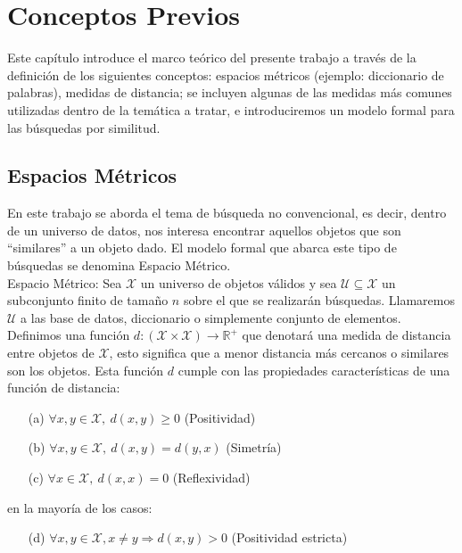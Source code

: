 \chapter{Conceptos Previos}

Este cap\'itulo introduce el marco te\'orico del presente trabajo a trav\'es de la definici\'on de los siguientes conceptos: espacios m\'etricos (ejemplo: diccionario de palabras), medidas de distancia; se incluyen algunas de las medidas m\'as comunes utilizadas dentro de la tem\'atica a tratar, e introduciremos un modelo formal para las b\'usquedas por similitud.

\section{Espacios M\'etricos}

En este trabajo se aborda el tema de b\'usqueda no convencional, es decir, dentro de un universo de datos, nos interesa encontrar aquellos objetos que son ``similares'' a un objeto dado. El modelo formal que abarca este tipo de b\'usquedas se denomina Espacio M\'etrico.\\

Espacio M\'etrico:
Sea $\mathcal{X}$ un universo de objetos v\'alidos y sea $\mathcal{U} \subseteq \mathcal{X}$ un subconjunto finito de tama\~no $n$ sobre el que se realizar\'an b\'usquedas. Llamaremos $\mathcal{U}$ a las base de datos, diccionario o simplemente conjunto de elementos. Definimos una funci\'on $d:(\mathcal{X} \times \mathcal{X}) \rightarrow \mathbb R^+$ que denotar\'a una medida de distancia entre objetos de $\mathcal{X}$, esto significa que a menor distancia m\'as cercanos o similares son los objetos. Esta funci\'on $d$ cumple con las propiedades caracter\'isticas de una funci\'on de distancia:

\begin{enumerate}
\item [(a)] $\forall x,y \in \mathcal{X}, \:d(x,y) \geq 0$ (Positividad)
\item [(b)] $\forall x,y \in \mathcal{X}, \:d(x,y) = d(y,x)$ (Simetr\'ia)
\item [(c)] $\forall x \in \mathcal{X}, \:d(x,x) = 0 $ (Reflexividad)
\end{enumerate}
en la mayor\'ia de los casos:
\begin{enumerate}
\item [(d)]  $\forall x,y \in \mathcal{X}, x \neq y \Rightarrow d(x,y) > 0$ (Positividad estricta)
\end{enumerate}

